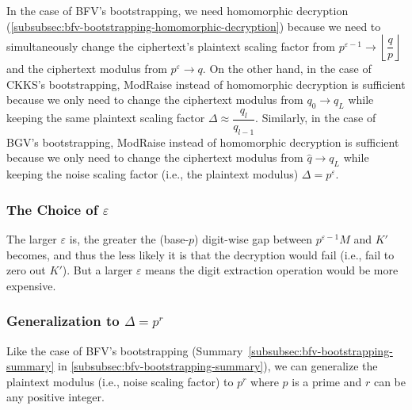 In the case of BFV's bootstrapping, we need homomorphic decryption (\autoref{subsubsec:bfv-bootstrapping-homomorphic-decryption}) because we need to simultaneously change the ciphertext's plaintext scaling factor from $p^{\varepsilon-1} \rightarrow \left\lfloor\dfrac{q}{p}\right\rfloor$ and the ciphertext modulus from $p^\varepsilon \rightarrow q$. On the other hand, in the case of CKKS's bootstrapping, \textsf{ModRaise} instead of homomorphic decryption is sufficient because we only need to change the ciphertext modulus from $q_0 \rightarrow q_L$ while keeping the same plaintext scaling factor $\Delta \approx \dfrac{q_l}{q_{l-1}}$. Similarly, in the case of BGV's bootstrapping, \textsf{ModRaise} instead of homomorphic decryption is sufficient because we only need to change the ciphertext modulus from $\hat{q} \rightarrow q_L$ while keeping the noise scaling factor (i.e., the plaintext modulus) $\Delta = p^\varepsilon$. 


\subsubsection{The Choice of $\varepsilon$} 

The larger $\varepsilon$ is, the greater the (base-$p$) digit-wise gap between $p^{\varepsilon-1}M$ and $K'$ becomes, and thus the less likely it is that the decryption would fail (i.e., fail to zero out $K'$). But a larger $\varepsilon$ means the digit extraction operation would be more expensive. 

\subsubsection{Generalization to $\Delta = p^r$} 

Like the case of BFV's bootstrapping (Summary~\ref*{subsubsec:bfv-bootstrapping-summary} in \autoref{subsubsec:bfv-bootstrapping-summary}), we can generalize the plaintext modulus (i.e., noise scaling factor) to $p^r$ where $p$ is a prime and $r$ can be any positive integer. 

